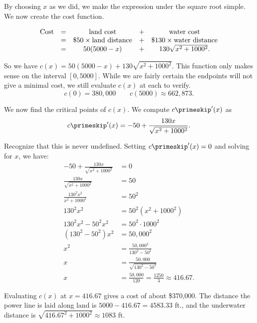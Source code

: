 \begin{example}
By choosing $x$ as we did, we make the expression under the square root simple. We now create the cost function. 

\[
\begin{array}{ c c c c c }
	\text{Cost} &=&  \text{land cost} &+ & \text{water cost} \\
	&=& \text{\$50}\times \text{land distance} &+& \text{\$130}\times \text{water distance} \\
	&=& 50(5000-x) &+& 130\sqrt{x^2+1000^2}.\\
\end{array}
\]

So we have $c(x) = 50(5000-x)+ 130\sqrt{x^2+1000^2}$. This function only makes sense on the interval $[0,5000]$. While we are fairly certain the endpoints will not give a minimal cost, we still evaluate $c(x)$ at each to verify.
\[c(0) = 380,000 \quad\quad c(5000) \approx 662,873.\]

We now find the critical points of $c(x)$. We compute $c\primeskip'(x)$ as 
\[c\primeskip'(x) = -50+\frac{130x}{\sqrt{x^2+1000^2}}.\]

Recognize that this is never undefined. Setting $c\primeskip'(x)=0$ and solving for $x$, we have:
{\allowdisplaybreaks
\begin{align*}
-50+\frac{130x}{\sqrt{x^2+1000^2}} &= 0 \\
\frac{130x}{\sqrt{x^2+1000^2}}  &= 50\\
\frac{130^2x^2}{x^2+1000^2} &= 50^2\\
130^2x^2 &= 50^2(x^2+1000^2) \\
130^2x^2-50^2x^2 &= 50^2\cdot1000^2\\
(130^2-50^2)x^2 &= 50,000^2\\
x^2 &= \frac{50,000^2}{130^2-50^2}\\
x &= \frac{50,000}{\sqrt{130^2-50^2}}\\
x & = \frac{50,000}{120} =\frac{1250}{3} %
\approx 416.67.
\end{align*}}

Evaluating $c(x)$ at $x=416.67$ gives a cost of about \$370,000. The distance the power line is laid along land is $5000-416.67 = 4583.33$ ft., and the underwater distance is $\sqrt{416.67^2+1000^2} \approx 1083$ ft.
\end{example}


